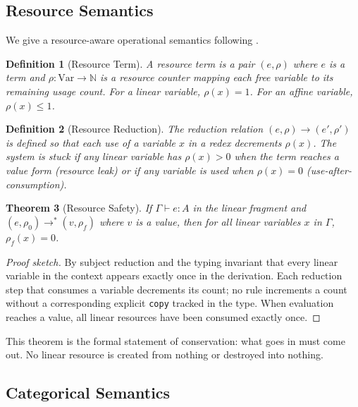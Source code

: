 \documentclass[11pt,a4paper]{article}
\newtheorem{theorem}{Theorem}[section]
\newtheorem{definition}[theorem]{Definition}
\begin{document}
\subsection{Resource Semantics}

We give a resource-aware operational semantics following
\citet{abramsky1993computational}.

\begin{definition}[Resource Term]
A \emph{resource term} is a pair $(e, \rho)$ where $e$ is a term and
$\rho : \text{Var} \to \mathbb{N}$ is a \emph{resource counter}
mapping each free variable to its remaining usage count. For a linear
variable, $\rho(x) = 1$. For an affine variable, $\rho(x) \leq 1$.
\end{definition}

\begin{definition}[Resource Reduction]
The reduction relation $(e, \rho) \longrightarrow (e', \rho')$ is
defined so that each use of a variable $x$ in a redex decrements
$\rho(x)$. The system is \emph{stuck} if any linear variable has
$\rho(x) > 0$ when the term reaches a value form (resource leak) or
if any variable is used when $\rho(x) = 0$ (use-after-consumption).
\end{definition}

\begin{theorem}[Resource Safety]
\label{thm:resource-safety}
If $\Gamma \vdash e : A$ in the linear fragment and $(e, \rho_0)
\longrightarrow^* (v, \rho_f)$ where $v$ is a value, then for all
linear variables $x$ in $\Gamma$, $\rho_f(x) = 0$.
\end{theorem}

\begin{proof}[Proof sketch]
By subject reduction and the typing invariant that every linear
variable in the context appears exactly once in the derivation.
Each reduction step that consumes a variable decrements its count;
no rule increments a count without a corresponding explicit
\texttt{copy} tracked in the type. When evaluation reaches a value,
all linear resources have been consumed exactly once.
\end{proof}

This theorem is the formal statement of conservation: what goes in
must come out. No linear resource is created from nothing or
destroyed into nothing.

\subsection{Categorical Semantics}
\end{document}
